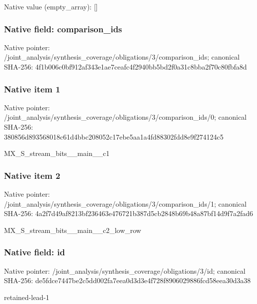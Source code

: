 \documentclass[10pt,a4paper]{article}
\begin{document}
Native value (empty\_\allowbreak{}array): []

\subsubsection{Native field: comparison\_\allowbreak{}ids}
Native pointer: /joint\_\allowbreak{}analysis/synthesis\_\allowbreak{}coverage/obligations/3/comparison\_\allowbreak{}ids; canonical SHA-256: 4f1b006c0bf912af343e1ae7ceafc4f2940bb5bd2f0a31c8bba2f70c80fbfa8d

\subsubsection{Native item 1}
Native pointer: /joint\_\allowbreak{}analysis/synthesis\_\allowbreak{}coverage/obligations/3/comparison\_\allowbreak{}ids/0; canonical SHA-256: 380856d893568018c61d4bbc208052c17ebe5aa1a4fd88302fdd8e9f274124c5

\begingroup\raggedright\sloppy MX\_\allowbreak{}S\_\allowbreak{}stream\_\allowbreak{}bits\_\allowbreak{}\_\allowbreak{}main\_\allowbreak{}\_\allowbreak{}c1\par\endgroup

\subsubsection{Native item 2}
Native pointer: /joint\_\allowbreak{}analysis/synthesis\_\allowbreak{}coverage/obligations/3/comparison\_\allowbreak{}ids/1; canonical SHA-256: 4a2f7d49af8213bf236463e476721b387d5cb2848b69b48a87bf14d9f7a2fad6

\begingroup\raggedright\sloppy MX\_\allowbreak{}S\_\allowbreak{}stream\_\allowbreak{}bits\_\allowbreak{}\_\allowbreak{}main\_\allowbreak{}\_\allowbreak{}c2\_\allowbreak{}low\_\allowbreak{}row\par\endgroup

\subsubsection{Native field: id}
Native pointer: /joint\_\allowbreak{}analysis/synthesis\_\allowbreak{}coverage/obligations/3/id; canonical SHA-256: de5fdce7447be2c5dd002fa7eea0d3d3e4f728f8906029886fcd58eea30d3a38

\begingroup\raggedright\sloppy retained-lead-1\par\endgroup
\end{document}
